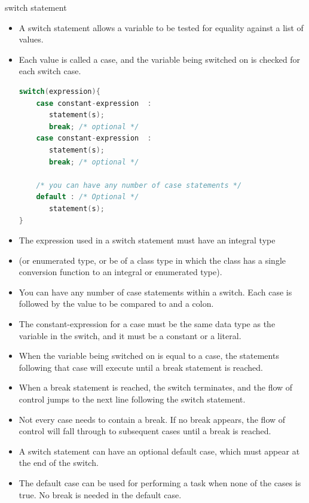 \documentclass[10pt,t]{beamer}
\begin{document}
\begin{frame}[fragile]{}
  
\end{frame}

\begin{frame}{switch statement}
  \begin{itemize}
    \item A switch statement allows a variable to be tested for equality against a list of values. 
    \item Each value is called a case, and the variable being switched on is checked for each switch case.
      \begin{lstlisting}[language=C,basicstyle=\scriptsize\ttfamily]
switch(expression){
    case constant-expression  :
       statement(s);
       break; /* optional */
    case constant-expression  :
       statement(s);
       break; /* optional */
  
    /* you can have any number of case statements */
    default : /* Optional */
       statement(s);
}
      \end{lstlisting}
    \item The expression used in a switch statement must have an integral type 
    \item[](or enumerated type, or be of a class type in which the class has a single conversion function to an integral or enumerated type).
    \item You can have any number of case statements within a switch. Each case is followed by the value to be compared to and a colon.
    \item The constant-expression for a case must be the same data type as the variable in the switch, and it must be a constant or a literal.
    \item When the variable being switched on is equal to a case, the statements following that case will execute until a break statement is reached.
    \item When a break statement is reached, the switch terminates, and the flow of control jumps to the next line following the switch statement.
    \item Not every case needs to contain a break. If no break appears, the flow of control will fall through to subsequent cases until a break is reached.
    \item A switch statement can have an optional default case, which must appear at the end of the switch. 
    \item The default case can be used for performing a task when none of the cases is true. No break is needed in the default case.
  \end{itemize}
  
\end{frame}
\end{document}
